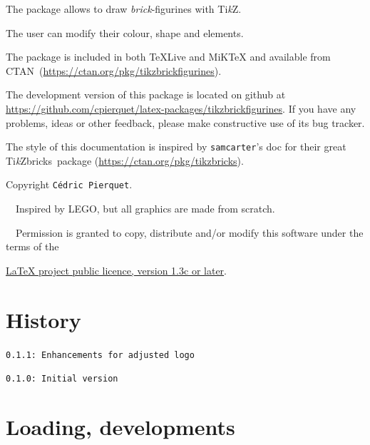 \documentclass[11pt,a4paper]{ltxdoc}
\providecommand*{\CTAN}{\textsc{CTAN}\xspace}
\providecommand*{\TikZ}{Ti\emph{k}Z\xspace}
\providecommand*{\miktex}{MiK\TeX\xspace}
\providecommand*{\texlive}{\TeX{}Live\xspace}
\providecommand*{\tikzbrick}{Ti\emph{k}Zbricks\xspace}
\begin{document}
The package allows to draw \textit{brick}-figurines with \TikZ.

The user can modify their colour, shape and elements.

\medskip

The package is included in both \texlive and \miktex and available from \CTAN\  (\url{https://ctan.org/pkg/tikzbrickfigurines}).

\medskip

The development version of this package is located on github at \url{https://github.com/cpierquet/latex-packages/tikzbrickfigurines}. If you have any problems, ideas or other feedback, please make constructive use of its bug tracker.

\medskip

The style of this documentation is inspired by \texttt{samcarter}'s doc for their great \tikzbrick\ package (\url{https://ctan.org/pkg/tikzbricks}).

\medskip

Copyright  \texttt{Cédric Pierquet}.

\textbullet~~Inspired by LEGO\texttrademark, but all graphics are made from scratch.

\textbullet~~Permission is granted to copy, distribute and\slash or modify this software under the terms of the

\hfill\href{https://www.latex-project.org/lppl.txt}{LaTeX project public licence, version 1.3c or later}.\hfill\null

\vfill\null

\pagebreak


\hypertarget{matoc}{}

\tableofcontents

\vspace*{5mm}

\vfill

\section{History}

\texttt{0.1.1: Enhancements for adjusted logo}

\texttt{0.1.0: Initial version}

\vspace*{5mm}

\pagebreak

\section{Loading, developments}
\end{document}
